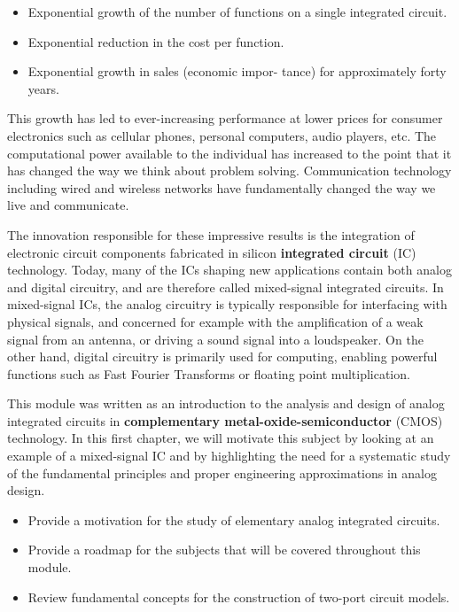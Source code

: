\documentclass[
  11pt,
  letterpaper,
  abstract]{scrbook}
\begin{document}
\begin{itemize}
\item
  Exponential growth of the number of functions on a single integrated
  circuit.
\item
  Exponential reduction in the cost per function.
\item
  Exponential growth in sales (economic impor- tance) for approximately
  forty years.
\end{itemize}

This growth has led to ever-increasing performance at lower prices for
consumer electronics such as cellular phones, personal computers, audio
players, etc. The computational power available to the individual has
increased to the point that it has changed the way we think about
problem solving. Communication technology including wired and wireless
networks have fundamentally changed the way we live and communicate.

The innovation responsible for these impressive results is the
integration of electronic circuit components fabricated in silicon
\textbf{integrated circuit} (IC) technology. Today, many of the ICs
shaping new applications contain both analog and digital circuitry, and
are therefore called mixed-signal integrated circuits. In mixed-signal
ICs, the analog circuitry is typically responsible for interfacing with
physical signals, and concerned for example with the amplification of a
weak signal from an antenna, or driving a sound signal into a
loudspeaker. On the other hand, digital circuitry is primarily used for
computing, enabling powerful functions such as Fast Fourier Transforms
or floating point multiplication.

This module was written as an introduction to the analysis and design of
analog integrated circuits in \textbf{complementary
metal-oxide-semiconductor} (CMOS) technology. In this first chapter, we
will motivate this subject by looking at an example of a mixed-signal IC
and by highlighting the need for a systematic study of the fundamental
principles and proper engineering approximations in analog design.

\begin{tcolorbox}[enhanced jigsaw, colbacktitle=quarto-callout-tip-color!10!white, breakable, colframe=quarto-callout-tip-color-frame, colback=white, title=\textcolor{quarto-callout-tip-color}{\faLightbulb}\hspace{0.5em}{Chapter Objectives}, titlerule=0mm, left=2mm, opacityback=0, leftrule=.75mm, opacitybacktitle=0.6, toptitle=1mm, rightrule=.15mm, bottomtitle=1mm, arc=.35mm, bottomrule=.15mm, toprule=.15mm, coltitle=black]

\begin{itemize}
\item
  Provide a motivation for the study of elementary analog integrated
  circuits.
\item
  Provide a roadmap for the subjects that will be covered throughout
  this module.
\item
  Review fundamental concepts for the construction of two-port circuit
  models.
\end{itemize}

\end{tcolorbox}
\end{document}
